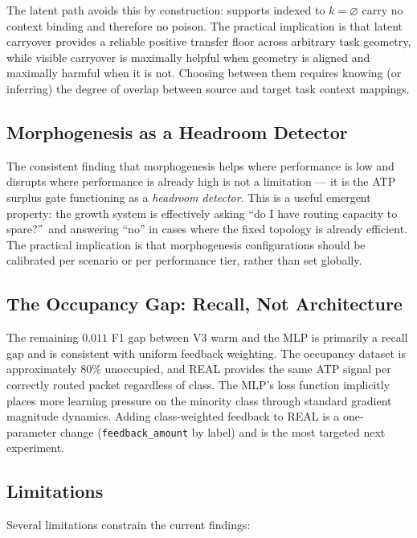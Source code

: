\documentclass[10pt,twocolumn]{article}
\begin{document}
The latent path avoids this by construction: supports indexed to
$k = \varnothing$ carry no context binding and therefore no poison.
The practical implication is that latent carryover provides a reliable positive
transfer floor across arbitrary task geometry, while visible carryover is
maximally helpful when geometry is aligned and maximally harmful when it is not.
Choosing between them requires knowing (or inferring) the degree of overlap
between source and target task context mappings.

\subsection{Morphogenesis as a Headroom Detector}

The consistent finding that morphogenesis helps where performance is low
and disrupts where performance is already high is not a limitation --- it is
the ATP surplus gate functioning as a \emph{headroom detector}.
This is a useful emergent property: the growth system is effectively asking
``do I have routing capacity to spare?''\ and answering ``no'' in cases where
the fixed topology is already efficient.
The practical implication is that morphogenesis configurations should be
calibrated per scenario or per performance tier, rather than set globally.

\subsection{The Occupancy Gap: Recall, Not Architecture}

The remaining $0.011$ F1 gap between V3 warm and the MLP is primarily a recall
gap and is consistent with uniform feedback weighting.
The occupancy dataset is approximately $80\%$ unoccupied, and REAL provides
the same ATP signal per correctly routed packet regardless of class.
The MLP's loss function implicitly places more learning pressure on the
minority class through standard gradient magnitude dynamics.
Adding class-weighted feedback to REAL is a one-parameter change
(\texttt{feedback\_amount} by label) and is the most targeted next experiment.

\subsection{Limitations}

Several limitations constrain the current findings:
\end{document}
